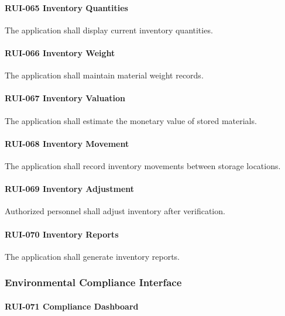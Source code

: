 \paragraph{RUI-065 Inventory Quantities}

The application shall display current inventory quantities.

\paragraph{RUI-066 Inventory Weight}

The application shall maintain material weight records.

\paragraph{RUI-067 Inventory Valuation}

The application shall estimate the monetary value of stored materials.

\paragraph{RUI-068 Inventory Movement}

The application shall record inventory movements between storage
locations.

\paragraph{RUI-069 Inventory Adjustment}

Authorized personnel shall adjust inventory after verification.

\paragraph{RUI-070 Inventory Reports}

The application shall generate inventory reports.


\subsubsection*{Environmental Compliance Interface}

\paragraph{RUI-071 Compliance Dashboard}

